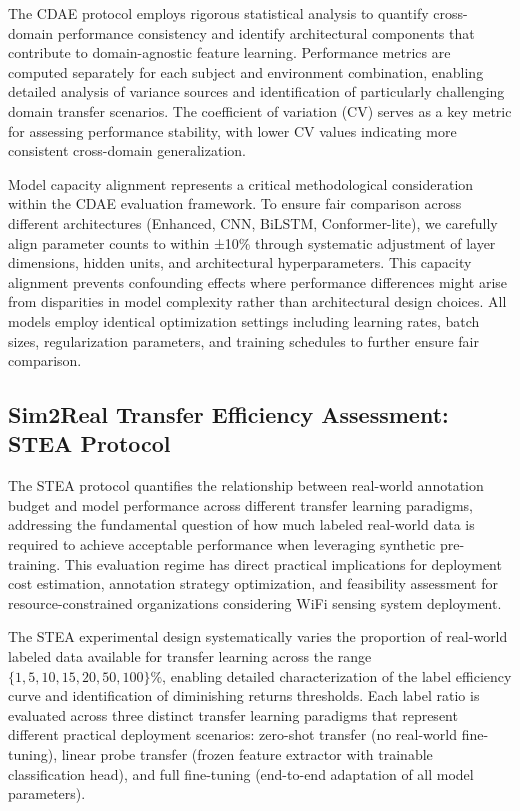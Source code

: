 \documentclass[journal]{IEEEtran}
\begin{document}
The CDAE protocol employs rigorous statistical analysis to quantify cross-domain performance consistency and identify architectural components that contribute to domain-agnostic feature learning. Performance metrics are computed separately for each subject and environment combination, enabling detailed analysis of variance sources and identification of particularly challenging domain transfer scenarios. The coefficient of variation (CV) serves as a key metric for assessing performance stability, with lower CV values indicating more consistent cross-domain generalization.

Model capacity alignment represents a critical methodological consideration within the CDAE evaluation framework. To ensure fair comparison across different architectures (Enhanced, CNN, BiLSTM, Conformer-lite), we carefully align parameter counts to within ±10\% through systematic adjustment of layer dimensions, hidden units, and architectural hyperparameters. This capacity alignment prevents confounding effects where performance differences might arise from disparities in model complexity rather than architectural design choices. All models employ identical optimization settings including learning rates, batch sizes, regularization parameters, and training schedules to further ensure fair comparison.

\subsection{Sim2Real Transfer Efficiency Assessment: STEA Protocol}

The STEA protocol quantifies the relationship between real-world annotation budget and model performance across different transfer learning paradigms, addressing the fundamental question of how much labeled real-world data is required to achieve acceptable performance when leveraging synthetic pre-training. This evaluation regime has direct practical implications for deployment cost estimation, annotation strategy optimization, and feasibility assessment for resource-constrained organizations considering WiFi sensing system deployment.

The STEA experimental design systematically varies the proportion of real-world labeled data available for transfer learning across the range $\{1, 5, 10, 15, 20, 50, 100\}\%$, enabling detailed characterization of the label efficiency curve and identification of diminishing returns thresholds. Each label ratio is evaluated across three distinct transfer learning paradigms that represent different practical deployment scenarios: zero-shot transfer (no real-world fine-tuning), linear probe transfer (frozen feature extractor with trainable classification head), and full fine-tuning (end-to-end adaptation of all model parameters).
\end{document}
